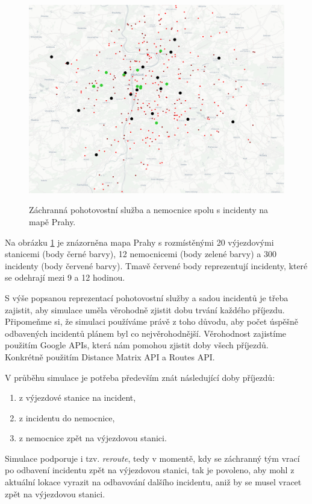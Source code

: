 \begin{figure}[H]
  \caption{Záchranná pohotovostní služba a nemocnice spolu s incidenty na mapě Prahy.}
  \includegraphics[width=\textwidth]{img/prague_monday_420.png}
  \centering
  \label{img:prague}
\end{figure}

Na obrázku \ref{img:prague} je znázorněna mapa Prahy s rozmístěnými 20 výjezdovými stanicemi (body černé barvy), 12 nemocnicemi (body zelené barvy) a 300 incidenty (body červené barvy).
Tmavě červené body reprezentují incidenty, které se odehrají mezi 9 a 12 hodinou.

S výše popsanou reprezentací pohotovostní služby a sadou incidentů je třeba zajistit, aby simulace uměla věrohodně zjistit dobu trvání každého příjezdu.
Připomeňme si, že simulaci používáme právě z toho důvodu, aby počet úspěšně odbavených incidentů plánem byl co nejvěrohodnější.
Věrohodnost zajistíme použitím Google APIs, která nám pomohou zjistit doby všech příjezdů. Konkrétně použitím Distance Matrix API a Routes API.

V průběhu simulace je potřeba především znát následující doby příjezdů:
\begin{enumerate}
  \item z výjezdové stanice na incident,
  \item z incidentu do nemocnice,
  \item z nemocnice zpět na výjezdovou stanici.
\end{enumerate}

Simulace podporuje i tzv. \textit{reroute}, tedy v momentě, kdy se záchranný tým vrací po odbavení incidentu zpět na výjezdovou stanici,
tak je povoleno, aby mohl z aktuální lokace vyrazit na odbavování dalšího incidentu, aniž by se musel vracet zpět na výjezdovou stanici.

